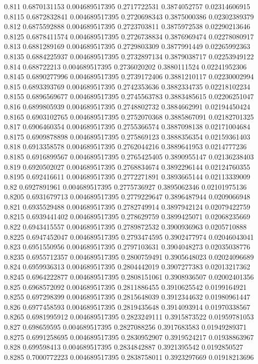 {0.811 0.6870131153 0.004689517395 0.2717722531 0.3874052757 0.02314606915
0.8115 0.6872832841 0.004689517395 0.2720698343 0.3875000386 0.02302389379
0.812 0.6875592888 0.004689517395 0.2723703811 0.3875972538 0.02290213646
0.8125 0.6878411574 0.004689517395 0.2726738834 0.3876969474 0.02278080917
0.813 0.6881289169 0.004689517395 0.2729803309 0.3877991449 0.02265992363
0.8135 0.6884225937 0.004689517395 0.2732897134 0.3879038717 0.02253949122
0.814 0.688722213 0.004689517395 0.2736020202 0.3880111524 0.02241952306
0.8145 0.6890277996 0.004689517395 0.2739172406 0.3881210117 0.02230002994
0.815 0.6893393769 0.004689517395 0.2742353636 0.3882334735 0.02218102234
0.8155 0.6896569677 0.004689517395 0.2745563783 0.3883485615 0.02206251047
0.816 0.6899805939 0.004689517395 0.2748802732 0.3884662991 0.02194450424
0.8165 0.6903102765 0.004689517395 0.2752070368 0.3885867091 0.02182701325
0.817 0.6906460354 0.004689517395 0.2755366574 0.3887098138 0.02171004684
0.8175 0.6909878898 0.004689517395 0.275869123 0.3888356354 0.02159361403
0.818 0.6913358578 0.004689517395 0.2762044216 0.3889641953 0.0214777236
0.8185 0.6916899567 0.004689517395 0.2765425405 0.3890955147 0.02136238403
0.819 0.6920502027 0.004689517395 0.2768834674 0.3892296144 0.02124760355
0.8195 0.692416611 0.004689517395 0.2772271891 0.3893665144 0.02113339009
0.82 0.6927891961 0.004689517395 0.2775736927 0.3895062346 0.02101975136
0.8205 0.6931679713 0.004689517395 0.2779229647 0.3896487944 0.0209066948
0.821 0.6935529488 0.004689517395 0.2782749914 0.3897942124 0.02079422759
0.8215 0.6939441402 0.004689517395 0.278629759 0.3899425071 0.02068235669
0.822 0.6943415557 0.004689517395 0.2789872532 0.3900936963 0.0205710888
0.8225 0.6947452047 0.004689517395 0.2793474595 0.3902477974 0.02046043041
0.823 0.6951550956 0.004689517395 0.2797103631 0.3904048273 0.02035038776
0.8235 0.6955712357 0.004689517395 0.2800759491 0.3905648023 0.02024096689
0.824 0.6959936313 0.004689517395 0.2804442019 0.3907277383 0.02013217362
0.8245 0.6964222877 0.004689517395 0.2808151061 0.3908936507 0.02002401356
0.825 0.6968572092 0.004689517395 0.2811886455 0.3910625542 0.0199164921
0.8255 0.697298399 0.004689517395 0.2815648039 0.3912344632 0.01980961447
0.826 0.6977458593 0.004689517395 0.2819435648 0.3914093914 0.01970338567
0.8265 0.6981995912 0.004689517395 0.2823249111 0.3915873522 0.01959781053
0.827 0.698659595 0.004689517395 0.2827088256 0.3917683583 0.01949289371
0.8275 0.6991258695 0.004689517395 0.2830952907 0.3919524217 0.01938863967
0.828 0.699598413 0.004689517395 0.2834842887 0.3921395542 0.0192850527
0.8285 0.7000772223 0.004689517395 0.2838758011 0.3923297669 0.01918213696
}
